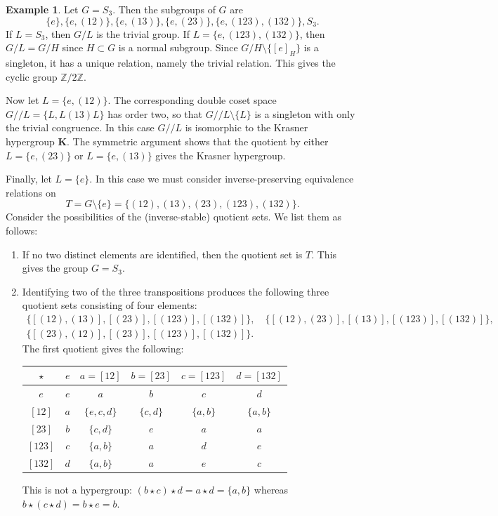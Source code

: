 \documentclass[reqno]{amsart}
\newcommand{\K}{\mathbf{K}}
\newcommand{\modmod}{/\!/}
\numberwithin{equation}{section}
\theoremstyle{plain}
\theoremstyle{definition}
\newtheorem{example}[equation]{Example}
\begin{document}
\begin{example}
    Let $G=S_3$. Then the subgroups of $G$ are
$$\{e\}, \{e, (12)\}, \{e, (13)\}, \{e, (23)\}, \{e, (123), (132)\}, S_3.$$
If $L=S_3$, then $G/L$ is the trivial group. If $L=\{e, (123), (132)\}$, then $G/L=G/H$ since $H\subset G$ is a normal subgroup.
Since $G/H\setminus\{[e]_H\}$ is a singleton, it has a unique relation, namely the trivial relation. This gives the cyclic group $\mathbb{Z}/2\mathbb{Z}$. 

Now let $L=\{e, (12)\}$. The corresponding double coset space 
$G \modmod L = \{L, L(13)L\}$ has order two, so that $G \modmod L \setminus \{L\}$ is a singleton with only the trivial congruence.
In this case $G \modmod L$ is isomorphic to the Krasner hypergroup $\K$. The symmetric argument shows that the quotient by either $L = \{e, (23)\}$ or $L = \{e, (13)\}$ gives the Krasner hypergroup.

Finally, let $L=\{e\}$. In this case we must consider inverse-preserving equivalence relations on $$T=G\setminus\{e\}=\{(12), (13), (23), (123), (132)\}.$$ 
Consider the possibilities of the (inverse-stable) quotient sets. We list them as follows:
\begin{enumerate}
    \item If no two distinct elements are identified, then the quotient set is $T$. This gives the group $G=S_3$.
    \item Identifying two of the three transpositions produces the following three quotient sets consisting of four elements:
\begin{gather*}
\{[(12), (13)], [(23)], [(123)], [(132)]\}, \quad
    \{[(12), (23)], [(13)], [(123)], [(132)]\}, \\
    \{[(23), (12)], [(23)], [(123)], [(132)]\}.
\end{gather*}
The first quotient gives the following:
\begin{center}
\begin{tabular}{ |c|c|c|c|c|c| } 
\hline
$\star$ & $e$ & $a=[12]$ & $b=[23]$ & $c=[123]$ & $d=[132]$ \\
\hline
$e$ & $e$ & $a$ & $b$ & $c$ & $d$ \\ 
\hline
$[12]$ & $a$ & $\{e, c, d\}$ & $\{c, d\}$
& $\{a, b\}$ & $\{a, b\}$\\ 
\hline
$[23]$ & $b$ & $\{c, d\}$ & $e$
& $a$ & $a$\\ 
\hline
$[123]$ & $c$ & $\{a, b\}$ & $a$
& $d$ & $e$\\ 
\hline
$[132]$ & $d$ & $\{a, b\}$ & $a$
& $e$ & $c$\\ 
\hline
\end{tabular}
\end{center} 
This is not a hypergroup: $(b\star c)\star d=a\star d=\{a, b\}$ whereas $b\star (c\star d)=b\star e=b$.


\end{enumerate}
\end{example}
\end{document}
